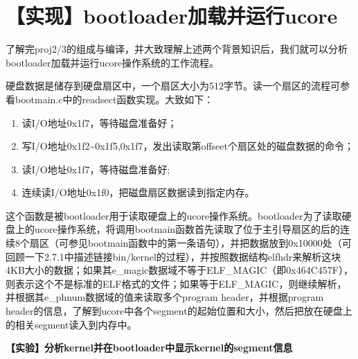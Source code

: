 \section{【实现】bootloader加载并运行ucore}\label{ux5b9eux73b0bootloaderux52a0ux8f7dux5e76ux8fd0ux884cucore}

了解完proj2/3的组成与编译，并大致理解上述两个背景知识后，我们就可以分析bootloader加载并运行ucore操作系统的工作流程。

硬盘数据是储存到硬盘扇区中，一个扇区大小为512字节。读一个扇区的流程可参看bootmain.c中的readsect函数实现。大致如下：

\begin{enumerate}
\def\labelenumi{\arabic{enumi}.}
\item
  读I/O地址0x1f7，等待磁盘准备好；
\item
  写I/O地址0x1f2\textasciitilde{}0x1f5,0x1f7，发出读取第offseet个扇区处的磁盘数据的命令；
\item
  读I/O地址0x1f7，等待磁盘准备好;
\item
  连续读I/O地址0x1f0，把磁盘扇区数据读到指定内存。
\end{enumerate}

这个函数是被bootloader用于读取硬盘上的ucore操作系统。bootloader为了读取硬盘上的ucore操作系统，将调用bootmain函数首先读取了位于主引导扇区的后的连续8个扇区（可参见bootmain函数中的第一条语句），并把数据放到0x10000处（可回顾一下2.7.1中描述链接bin/kernel的过程），并按照数据结构elfhdr来解析这块4KB大小的数据；如果其e\_magic数据域不等于ELF\_MAGIC（即0x464C457F），则表示这个不是标准的ELF格式的文件；如果等于ELF\_MAGIC，则继续解析，并根据其e\_phnum数据域的值来读取多个program
header，并根据program
header的信息，了解到ucore中各个segment的起始位置和大小，然后把放在硬盘上的相关segment读入到内存中。

\textbf{【实验】分析kernel并在bootloader中显示kernel的segment信息}

